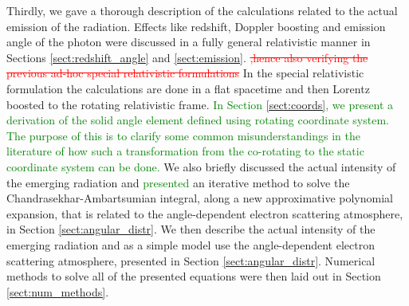\documentclass{aa}
\newcommand{\refe}[1]{\textcolor{green}{{#1}}}
\newcommand{\refedel}[1]{\textcolor{red}{\sout{#1}}}
\newcommand{\sch}{Schwarzschild }
\newcommand{\lgamma}{\gamma_{\text{L}}}
\begin{document}
Thirdly, we gave a thorough description of the calculations related to the actual emission of the radiation.
Effects like redshift, Doppler boosting and emission angle of the photon were discussed in a fully general relativistic manner in Sections \ref{sect:redshift_angle} and \ref{sect:emission}. 
\refedel{,hence also verifying the previous ad-hoc special relativistic formulations}%
In the special relativistic formulation \citep[see e.g.,][]{PB06} the calculations are done in a flat spacetime and then Lorentz boosted to the rotating relativistic frame.
\refe{In Section \ref{sect:coords}, we present a derivation of the solid angle element defined using rotating coordinate system.}
\refe{The purpose of this is to clarify some common misunderstandings in the literature of how such a transformation from the co-rotating to the static coordinate system can be done.}
We also briefly discussed the actual intensity of the emerging radiation and \refe{presented} an iterative method to solve the Chandrasekhar-Ambartsumian integral, along a new approximative polynomial expansion, that is related to the angle-dependent electron scattering atmosphere, in Section \ref{sect:angular_distr}.
We then describe the actual intensity of the emerging radiation and as a simple model use the angle-dependent electron scattering atmosphere, presented in Section \ref{sect:angular_distr}.
Numerical methods to solve all of the presented equations were then laid out in Section \ref{sect:num_methods}.
\end{document}
